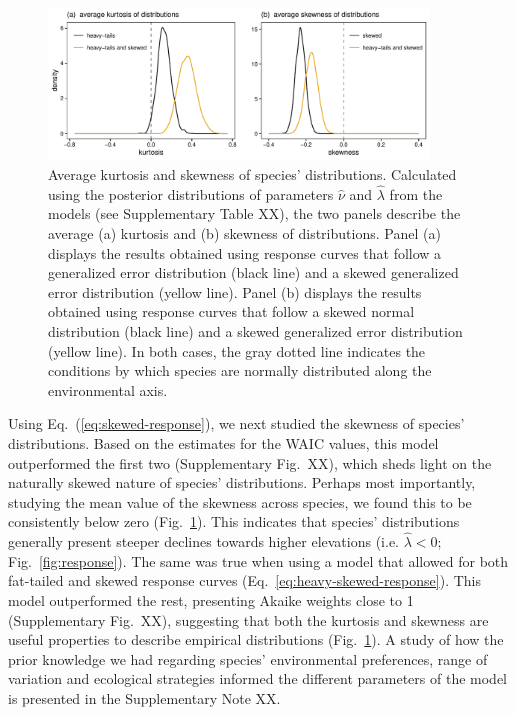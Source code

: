 \documentclass[11pt, a4paper]{article}
\begin{document}
\begin{figure}[ht]
  \centering
    \includegraphics[width=0.9\textwidth]{figures/kurto-skew}
    	  \vspace{0.1cm}
	   \caption{Average kurtosis and skewness of species' distributions. Calculated using the posterior distributions of parameters $\hat{\nu}$ and $\hat{\lambda}$ from the models (see Supplementary Table XX), the two panels describe the average (a) kurtosis and (b) skewness of distributions. Panel (a) displays the results obtained using response curves that follow a generalized error distribution (black line) and a skewed generalized error distribution (yellow line). Panel (b) displays the results obtained using response curves that follow a skewed normal distribution (black line) and a skewed generalized error distribution (yellow line). In both cases, the gray dotted line indicates the conditions by which species are normally distributed along the environmental axis.}
      \label{fig:kurtosis-skewness}
\end{figure}

Using Eq.~(\ref{eq:skewed-response}), we next studied the skewness of species' distributions. Based on the estimates for the WAIC values, this model outperformed the first two (Supplementary Fig.~XX), which sheds light on the naturally skewed nature of species' distributions. Perhaps most importantly, studying the mean value of the skewness across species, we found this to be consistently below zero (Fig.~\ref{fig:kurtosis-skewness}). This indicates that species' distributions generally present steeper declines towards higher elevations (i.e. $\hat{\lambda}<0$; Fig.~\ref{fig:response}). The same was true when using a model that allowed for both fat-tailed and skewed response curves (Eq.~\ref{eq:heavy-skewed-response}). This model outperformed the rest, presenting Akaike weights close to 1 (Supplementary Fig.~XX), suggesting that both the kurtosis and skewness are useful properties to describe empirical distributions (Fig.~\ref{fig:kurtosis-skewness}). A study of how the prior knowledge we had regarding species' environmental preferences, range of variation and ecological strategies informed the different parameters of the model is presented in the Supplementary Note XX. %
\end{document}
